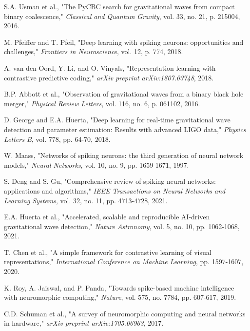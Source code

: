 \documentclass[12pt,a4paper]{article}
\begin{document}

\begin{thebibliography}{20}

S.A. Usman et al., "The PyCBC search for gravitational waves from compact binary coalescence," \textit{Classical and Quantum Gravity}, vol. 33, no. 21, p. 215004, 2016.

M. Pfeiffer and T. Pfeil, "Deep learning with spiking neurons: opportunities and challenges," \textit{Frontiers in Neuroscience}, vol. 12, p. 774, 2018.

A. van den Oord, Y. Li, and O. Vinyals, "Representation learning with contrastive predictive coding," \textit{arXiv preprint arXiv:1807.03748}, 2018.

B.P. Abbott et al., "Observation of gravitational waves from a binary black hole merger," \textit{Physical Review Letters}, vol. 116, no. 6, p. 061102, 2016.

D. George and E.A. Huerta, "Deep learning for real-time gravitational wave detection and parameter estimation: Results with advanced LIGO data," \textit{Physics Letters B}, vol. 778, pp. 64-70, 2018.

W. Maass, "Networks of spiking neurons: the third generation of neural network models," \textit{Neural Networks}, vol. 10, no. 9, pp. 1659-1671, 1997.

S. Deng and S. Gu, "Comprehensive review of spiking neural networks: applications and algorithms," \textit{IEEE Transactions on Neural Networks and Learning Systems}, vol. 32, no. 11, pp. 4713-4728, 2021.

E.A. Huerta et al., "Accelerated, scalable and reproducible AI-driven gravitational wave detection," \textit{Nature Astronomy}, vol. 5, no. 10, pp. 1062-1068, 2021.

T. Chen et al., "A simple framework for contrastive learning of visual representations," \textit{International Conference on Machine Learning}, pp. 1597-1607, 2020.

K. Roy, A. Jaiswal, and P. Panda, "Towards spike-based machine intelligence with neuromorphic computing," \textit{Nature}, vol. 575, no. 7784, pp. 607-617, 2019.

C.D. Schuman et al., "A survey of neuromorphic computing and neural networks in hardware," \textit{arXiv preprint arXiv:1705.06963}, 2017.


\end{thebibliography}
\end{document}
